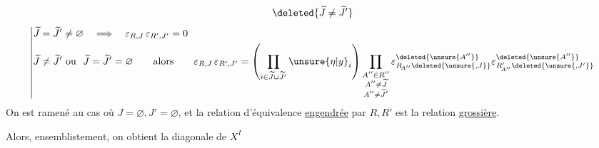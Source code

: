 \[
 \deleted{\widetilde J\ne\widetilde J'}
\]
\[
\left|\begin{aligned}
 &\widetilde J=\widetilde J'\ne\varnothing\quad\Longrightarrow\quad\varepsilon_{R,J}\,\varepsilon_{R',J'}=0\\
 &\widetilde J\ne\widetilde J'\ \text{ou }\ \widetilde J=\widetilde J'=\varnothing\qquad\text{alors}\qquad
 \varepsilon_{R,J}\,\varepsilon_{R',J'}=
 \left(\prod_{i\in\widetilde J\cup\widetilde J'}\unsure{\eta|y}_i\right)
 \prod_{\substack{A''\in R''\\A''\ne\widetilde J\\A''\ne\widetilde J'}}
 \varepsilon^{\deleted{\unsure{A''}}}_{R_{\!A''}\deleted{\unsure{,J}}}
 \varepsilon^{\deleted{\unsure{A''}}}_{R'_{\!A''}\deleted{\unsure{,J'}}}
\end{aligned}\right.
\]
On est ramené au cas où $J=\varnothing,J'=\varnothing$,
et la relation d'équivalence \uline{engendrée} par $R,R'$ est la relation \uline{grossière}.

Alors, ensemblistement, on obtient la diagonale de $X^I$

